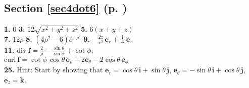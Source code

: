 \begin{multicols}{2}
\subsection*{Section \ref{sec4dot6} (p. \pageref{sec4dot6})}
\textbf{1.} $0$\quad
\textbf{3.} $12\sqrt{x^2 + y^2 + z^2}$\quad
\textbf{5.} $6(x+y+z)$\\
\textbf{7.} $12\rho$ \quad
\textbf{8.} $(4\rho^2 -6)e^{-\rho^2}$ \quad
\textbf{9.} $-\frac{2z}{r^3}\,\textbf{e}_{r} + \frac{1}{r^2}\,\textbf{e}_{z}$\\
\textbf{11.} $\text{div}~\textbf{f} = \frac{2}{\rho} - \frac{\sin\theta}{\sin\phi} + \cot\phi$;\\$\text{curl}~\textbf{f}
= \cot\phi\,\cos\theta\,\textbf{e}_{\rho} + 2\textbf{e}_{\theta} -2\cos\theta\,\textbf{e}_{\phi}$\\
\textbf{25.} Hint: Start by showing that $\textbf{e}_{r} = \cos\theta\,\textbf{i} + \sin\theta\,\textbf{j}$,
$\textbf{e}_{\theta} = -\sin\theta\,\textbf{i} + \cos\theta\,\textbf{j}$, $\textbf{e}_{z} = \textbf{k}$.
\end{multicols}
